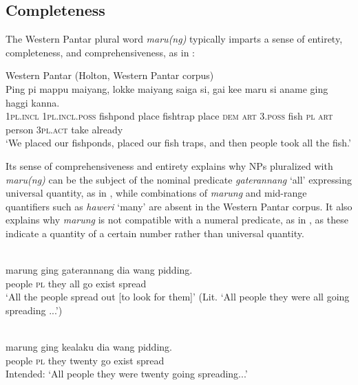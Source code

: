 \subsection{Completeness} %
\label{sec:9:4.1}
The Western Pantar plural word \textit{maru(ng)} typically imparts a sense of entirety, completeness, and comprehensiveness, as in :


\ea%
\label{ex:9:65}
Western Pantar (Holton, Western Pantar corpus)\\
\gll  Ping pi mappu maiyang, lokke maiyang saiga si, gai ke{{\textglotstop}}{e} maru si aname ging haggi kanna. \\
    \textsc{1pl.incl}  \textsc{1pl.incl.poss} fishpond place fishtrap place \textsc{dem} \textsc{art}  \textsc{3.poss} fish \textsc{pl} \textsc{art} person \textsc{3pl.act} take already \\
\glt `We placed our fishponds, placed our fish traps,  and then people took all the fish.'
\z


Its sense of comprehensiveness and entirety explains why NPs pluralized with \textit{maru(ng)} can be the subject of the nominal predicate \textit{gaterannang} `all' expressing universal quantity, as in , while combinations of \textit{marung} and mid-range quantifiers such as \textit{haweri} `many' are absent in the Western Pantar corpus. It also explains why \textit{marung} is not compatible with a numeral predicate, as in , as these indicate a quantity of a certain number rather than universal quantity.


\ea%
\label{ex:9:66}
 \\
 {marung}{\cb} ging gaterannang dia wang pidding. \\
   people \textsc{pl} they all  go exist spread  \\
\glt `All the people spread out [to look for them]' \citep{Holton2012}
(Lit. `All people they were all going spreading ...')
\z








\ea%
\label{ex:9:67}
 \\
 {marung}{\cb} ging kealaku dia wang pidding. \\
    people \textsc{pl} they twenty go exist spread \\
 \glt Intended: `All people they were twenty going spreading...'
\z






